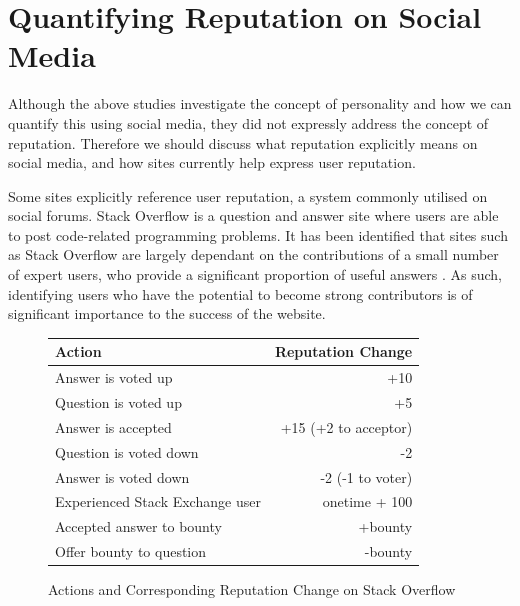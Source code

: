 \section{Quantifying Reputation on Social Media}


Although the above studies investigate the concept of personality and how we can quantify this using social media, they did not expressly address the concept of reputation. Therefore we should discuss what reputation explicitly means on social media, and how sites currently help express user reputation. 

Some sites explicitly reference user reputation, a system commonly utilised on social forums. Stack Overflow \cite{stackoverflow_site} is a question and answer site where users are able to post code-related programming problems. It has been identified that sites such as Stack Overflow are largely dependant on the contributions of a small number of expert users, who provide a significant proportion of useful answers \cite{movshovitzanalysis}. As such, identifying users who have the potential to become strong contributors is of significant importance to the success of the website.

\begin{figure}[h!]
\begin{center}
\begin{tabular}{l|r}
 Action & Reputation Change\\ \hline
 Answer is voted up & +10 \\
 Question is voted up & +5 \\
 Answer is accepted & +15 (+2 to acceptor) \\
 Question is voted down & -2 \\
 Answer is voted down & -2 (-1 to voter) \\
 Experienced Stack Exchange user & onetime + 100 \\
 Accepted answer to bounty & +bounty \\
 Offer bounty to question & -bounty \\ 
\end{tabular}
\end{center}
\caption{Actions and Corresponding Reputation Change on Stack Overflow \cite{movshovitzanalysis}}
\end{figure}

